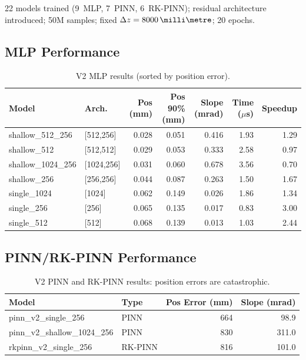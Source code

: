 \documentclass[11pt,a4paper]{article}
\newcommand{\SI}[2]{#1\,\text{#2}}
\newcommand{\dz}{\Delta z}
\begin{document}
22 models trained (9~MLP, 7~PINN, 6~RK-PINN); residual architecture
introduced; 50M samples; fixed $\dz=\SI{8000}{\milli\metre}$; 20 epochs.

\subsection{MLP Performance}

\begin{table}[H]
\centering
\caption{V2 MLP results (sorted by position error).}
\label{tab:v2_mlp}
\begin{tabular}{@{} l l r r
  r r r @{}}
\toprule
Model & Arch. & Pos (mm) & Pos 90\% (mm) & Slope (mrad)
  & Time ($\mu$s) & Speedup \\
\midrule
shallow\_512\_256 & {[512,256]} & 0.028 & 0.051 & 0.416 & 1.93 & 1.29 \\
shallow\_512     & {[512,512]} & 0.029 & 0.053 & 0.333 & 2.58 & 0.97 \\
shallow\_1024\_256 & {[1024,256]} & 0.031 & 0.060 & 0.678 & 3.56
  & 0.70 \\
shallow\_256     & {[256,256]} & 0.044 & 0.087 & 0.263 & 1.50 & 1.67 \\
single\_1024     & {[1024]}    & 0.062 & 0.149 & 0.026 & 1.86 & 1.34 \\
single\_256      & {[256]}     & 0.065 & 0.135 & 0.017 & 0.83 & 3.00 \\
single\_512      & {[512]}     & 0.068 & 0.139 & 0.013 & 1.03 & 2.44 \\
\bottomrule
\end{tabular}
\end{table}

\subsection{PINN/RK-PINN Performance}

\begin{table}[H]
\centering
\caption{V2 PINN and RK-PINN results: position errors are catastrophic.}
\label{tab:v2_pinn}
\begin{tabular}{@{} l l r r @{}}
\toprule
Model & Type & Pos Error (mm) & Slope (mrad) \\
\midrule
pinn\_v2\_single\_256      & PINN    & 664 & 98.9 \\
pinn\_v2\_shallow\_1024\_256 & PINN  & 830 & 311.0 \\
rkpinn\_v2\_single\_256    & RK-PINN & 816 & 101.0 \\
\bottomrule
\end{tabular}
\end{table}
\end{document}
